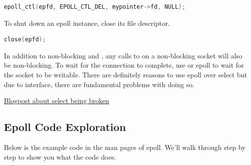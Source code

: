 \begin{lstlisting}[language=C]
epoll_ctl(epfd, EPOLL_CTL_DEL, mypointer->fd, NULL);
\end{lstlisting}

To shut down an epoll instance, close its file descriptor.

\begin{lstlisting}[language=C]
close(epfd);
\end{lstlisting}

In addition to non-blocking  and , any calls to  on a non-blocking socket will also be non-blocking.
To wait for the connection to complete, use  or epoll to wait for the socket to be writable.
There are definitely reasons to use epoll over select but due to interface, there are fundamental problems with doing so.

\href{https://idea.popcount.org/2017-01-06-select-is-fundamentally-broken/}{Blogpost about select being broken}

\subsection{Epoll Code Exploration}

Below is the example code in the man pages of epoll.
We'll walk through step by step to show you what the code does.

